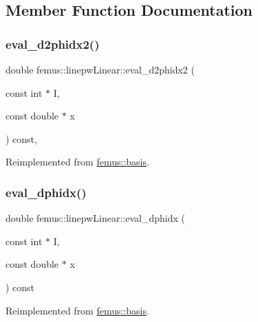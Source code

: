 \subsection{Member Function Documentation}
\mbox{\label{classfemus_1_1linepw_linear_ab935d5269619bc6d422a8fbad4daf017}} 
\subsubsection{\texorpdfstring{eval\+\_\+d2phidx2()}{eval\_d2phidx2()}}
{\footnotesize\ttfamily double femus\+::linepw\+Linear\+::eval\+\_\+d2phidx2 (\begin{DoxyParamCaption}\item[{const int $\ast$}]{I,  }\item[{const double $\ast$}]{x }\end{DoxyParamCaption}) const\hspace{0.3cm}{\ttfamily [inline]}, {\ttfamily [virtual]}}



Reimplemented from \mbox{\hyperlink{classfemus_1_1basis_a0a9839e75d1c9c8302486fc072eed028}{femus\+::basis}}.

\mbox{\label{classfemus_1_1linepw_linear_a8fca1e50abd1203c8c6867b37969e551}} 
\subsubsection{\texorpdfstring{eval\+\_\+dphidx()}{eval\_dphidx()}}
{\footnotesize\ttfamily double femus\+::linepw\+Linear\+::eval\+\_\+dphidx (\begin{DoxyParamCaption}\item[{const int $\ast$}]{I,  }\item[{const double $\ast$}]{x }\end{DoxyParamCaption}) const\hspace{0.3cm}{\ttfamily [virtual]}}



Reimplemented from \mbox{\hyperlink{classfemus_1_1basis_a4db7d29cf8a753ddbccc4a297dafa0bf}{femus\+::basis}}.

